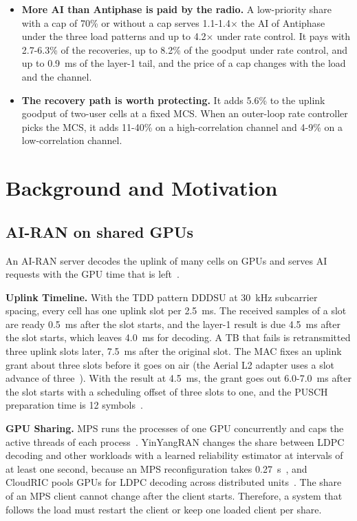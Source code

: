 \documentclass[acmsmall,screen,review,anonymous]{acmart}
\newcommand{\sys}{Antiphase\xspace}
\begin{document}
\begin{itemize}
not run, \sys serves 70\%. The 99th-percentile latency of its AI requests is
175-187~ms, inside the limit.
\item \textbf{More AI than \sys is paid by the radio.} A low-priority share with a cap of 70\% or without a
cap serves 1.1-1.4$\times$ the AI of \sys under the three load patterns and up to 4.2$\times$ under rate
control. It pays with 2.7-6.3\% of the recoveries, up to 8.2\% of the goodput under rate control, and up to
0.9~ms of the layer-1 tail, and the price of a cap changes with the load and the channel.
\item \textbf{The recovery path is worth protecting.} It adds 5.6\% to the uplink goodput of two-user cells
at a fixed MCS. When an outer-loop rate controller picks the MCS, it adds 11-40\% on a high-correlation
channel and 4-9\% on a low-correlation channel.
\end{itemize}

\section{Background and Motivation}

\subsection{AI-RAN on shared GPUs}

An AI-RAN server decodes the uplink of many cells on GPUs and serves AI requests with the GPU time that is
left~\cite{aerial,distributedairan}.

\noindent\textbf{Uplink Timeline.} With the TDD pattern DDDSU at 30~kHz subcarrier spacing, every cell has
one uplink slot per 2.5~ms. The received samples of a slot are ready 0.5~ms after the slot starts, and the
layer-1 result is due 4.5~ms after the slot starts, which leaves 4.0~ms for decoding. A TB that fails is
retransmitted three uplink slots later, 7.5~ms after the original slot. The MAC fixes an uplink grant about
three slots before it goes on air (the Aerial L2 adapter uses a slot advance of three~\cite{aerial}). With
the result at 4.5~ms, the grant goes out 6.0-7.0~ms after the slot starts with a scheduling offset of three
slots to one, and the PUSCH preparation time is 12 symbols~\cite{ts38214}.

\noindent\textbf{GPU Sharing.} MPS runs the processes of one GPU concurrently and caps the active threads of
each process~\cite{nvidiampS}. YinYangRAN changes the share between LDPC decoding and other workloads with
a learned reliability estimator at intervals of at least one second, because an MPS reconfiguration takes
0.27~s~\cite{yinyangran}, and CloudRIC pools GPUs for LDPC decoding across distributed
units~\cite{cloudric}. The share of an MPS client cannot change after the client starts. Therefore, a system
that follows the load must restart the client or keep one loaded client per share.
\end{document}

